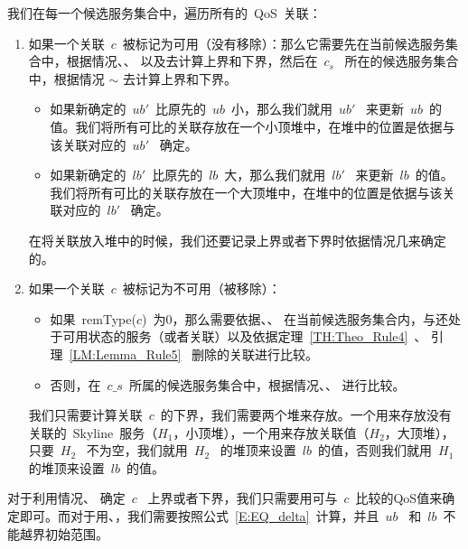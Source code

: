 我们在每一个候选服务集合中，遍历所有的~QoS~关联：
\begin{enumerate}
  \item 如果一个关联~$c$~被标记为可用（没有移除）：那么它需要先在当前候选服务集合中，根据情况\uppercase\expandafter{}、\uppercase\expandafter{}、\uppercase\expandafter{} 以及\uppercase\expandafter{}去计算上界和下界，然后在~$c_s$~ 所在的候选服务集合中，根据情况\uppercase\expandafter{} $\sim$ \uppercase\expandafter{}去计算上界和下界。
      \begin{itemize}
        \item 如果新确定的~$ub'$~比原先的~$ub$~小，那么我们就用~$ub'$~ 来更新~$ub$~的值。我们将所有可比的关联存放在一个小顶堆中，在堆中的位置是依据与该关联对应的~$ub'$~ 确定。
        \item 如果新确定的~$lb'$~比原先的~$lb$~大，那么我们就用~$lb'$~ 来更新~$lb$~的值。我们将所有可比的关联存放在一个大顶堆中，在堆中的位置是依据与该关联对应的~$lb'$~ 确定。
      \end{itemize}
      在将关联放入堆中的时候，我们还要记录上界或者下界时依据情况几来确定的。
  \item 如果一个关联~$c$~被标记为不可用（被移除）：
    \begin{itemize}
      \item 如果~remType($c$)~为0，那么需要依据\uppercase\expandafter{}、\uppercase\expandafter{}、\uppercase\expandafter{} 在当前候选服务集合内，与还处于可用状态的服务（或者关联）以及依据定理~\ref{TH:Theo_Rule4}~、 引理~\ref{LM:Lemma_Rule5}~ 删除的关联进行比较。
      \item 否则，在~$c\_s$~所属的候选服务集合中，根据情况\uppercase\expandafter{}、\uppercase\expandafter{}、\uppercase\expandafter{} 进行比较。
    \end{itemize}
    我们只需要计算关联~$c$~的下界，我们需要两个堆来存放。一个用来存放没有关联的~Skyline~服务（$H_{1}$，小顶堆），一个用来存放关联值（$H_{2}$，大顶堆），只要~$H_{2}$~ 不为空，我们就用~$H_{2}$~ 的堆顶来设置~$lb$~的值，否则我们就用~$H_{1}$~ 的堆顶来设置~$lb$~的值。
\end{enumerate}

对于利用情况\uppercase\expandafter{}、\uppercase\expandafter{} 确定~$c$~ 上界或者下界，我们只需要用可与~$c$~比较的QoS值来确定即可。而对于用\uppercase\expandafter{}、\uppercase\expandafter{}，我们需要按照公式~\ref{E:EQ_delta}~计算，并且~$ub$~ 和~$lb$~不能越界初始范围。

